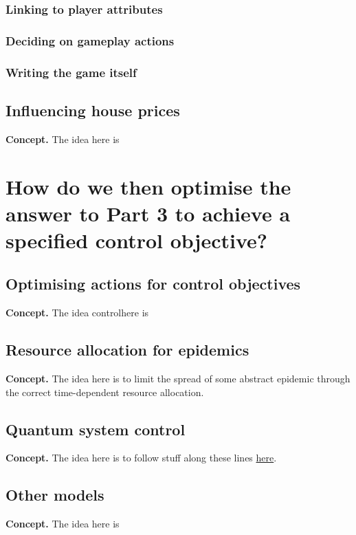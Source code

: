 \documentclass{book}
\begin{document}
\section{\sffamily Linking to player attributes}

\section{\sffamily Deciding on gameplay actions}

\section{\sffamily Writing the game itself}

\chapter{\sffamily Influencing house prices}

{\bfseries\sffamily Concept.} The idea here is 


\part*{{ How do we then optimise the answer to Part 3 to achieve a specified control objective?}}


\chapter{\sffamily Optimising actions for control objectives}

{\bfseries\sffamily Concept.} The idea  controlhere is 


\chapter{\sffamily Resource allocation for epidemics}

{\bfseries\sffamily Concept.} The idea here is to limit the spread of some abstract epidemic through the correct time-dependent resource allocation.


\chapter{\sffamily Quantum system control}

{\bfseries\sffamily Concept.} The idea here is to follow stuff along these lines \href{https://arxiv.org/pdf/1210.7127.pdf}{here}.


\chapter{\sffamily Other models}

{\bfseries\sffamily Concept.} The idea here is




\backmatter


\end{document}
